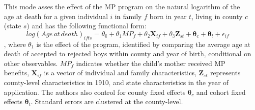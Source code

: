 This mode asses the effect of the MP program on the natural logarithm of the age at death for a given individual $i$ in family $f$ born in year $t$, living in county $c$ (state $s$) and has the following functional form:
$$
log(Age\,at\,death)_{ifts} = \theta_0 + \theta_1MP_f + \theta_2\mathbf{X}_{if} + \theta_3\mathbf{Z}_{st} + \mathbf{\theta}_c + \mathbf{\theta}_t + \epsilon_{if}
$$
, where $\theta_1$ is the effect of the program, identified by comparing the average age at death of accepted to rejected boys within county and year of birth, conditional on other observables. $MP_f$ indicates whether the child's mother received MP benefits, $\mathbf{X}_{if}$ is a vector of individual and family characteristics, $\mathbf{Z}_{st}$ represents county-level characteristics in 1910, and state characteristics in the year of application. The authors also control for county fixed effects $\mathbf{\theta}_c$ and cohort fixed effects $\mathbf{\theta}_t$. Standard errors are clustered at the county-level.

